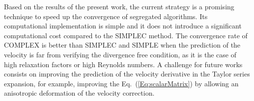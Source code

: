 \documentclass[final,3p,times,11pt,onecolumn]{myElsarticle}
\numberwithin{equation}{section}
\begin{document}
Based on the results of the present work, the current strategy is a promising technique to speed up the convergence of segregated algorithms. Its computational implementation is simple and it does not introduce a significant computational cost compared to the SIMPLEC method. The convergence rate of COMPLEX is better than SIMPLEC and SIMPLE when the prediction of the velocity is far from verifying the divergence free condition, as it is the case of high relaxation factors or high Reynolds numbers. A challenge for future works consists on improving the prediction of the velocity derivative in the Taylor series expansion, for example, improving the Eq.~(\ref{Eq:scalarMatrix}) by allowing an anisotropic deformation of the velocity correction. %



\end{document}
